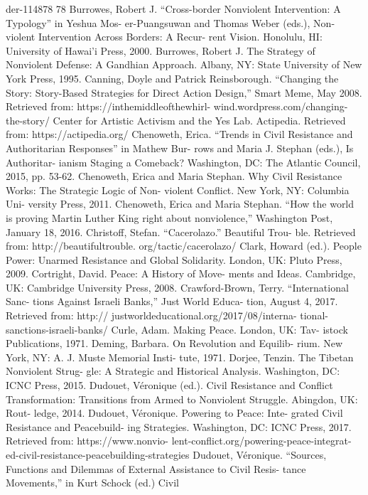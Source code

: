\documentclass[twoside,a4paper,12pt,fleqn,openany]{extbook}
\begin{document}
der-114878
78
Burrowes, Robert J. “Cross-border Nonviolent
Intervention: A Typology” in Yeshua Mos-
er-Puangsuwan and Thomas Weber (eds.), Non-
violent Intervention Across Borders: A Recur-
rent Vision. Honolulu, HI: University of Hawai’i
Press, 2000.
Burrowes, Robert J. The Strategy of Nonviolent
Defense: A Gandhian Approach. Albany, NY:
State University of New York Press, 1995.
Canning, Doyle and Patrick Reinsborough.
“Changing the Story: Story-Based Strategies for
Direct Action Design,” Smart Meme, May 2008.
Retrieved from: https://inthemiddleofthewhirl-
wind.wordpress.com/changing-the-story/
Center for Artistic Activism and the Yes Lab.
Actipedia. Retrieved from: https://actipedia.org/
Chenoweth, Erica. “Trends in Civil Resistance
and Authoritarian Responses” in Mathew Bur-
rows and Maria J. Stephan (eds.), Is Authoritar-
ianism Staging a Comeback? Washington, DC:
The Atlantic Council, 2015, pp. 53-62.
Chenoweth, Erica and Maria Stephan. Why Civil
Resistance Works: The Strategic Logic of Non-
violent Conflict. New York, NY: Columbia Uni-
versity Press, 2011.
Chenoweth, Erica and Maria Stephan. “How the
world is proving Martin Luther King right about
nonviolence,” Washington Post, January 18,
2016.
Christoff, Stefan. “Cacerolazo.” Beautiful Trou-
ble. Retrieved from: http://beautifultrouble.
org/tactic/cacerolazo/
Clark, Howard (ed.). People Power: Unarmed
Resistance and Global Solidarity. London, UK:
Pluto Press, 2009.
Cortright, David. Peace: A History of Move-
ments and Ideas. Cambridge, UK: Cambridge
University Press, 2008.
Crawford-Brown, Terry. “International Sanc-
tions Against Israeli Banks,” Just World Educa-
tion, August 4, 2017. Retrieved from: http://
justworldeducational.org/2017/08/interna-
tional-sanctions-israeli-banks/
Curle, Adam. Making Peace. London, UK: Tav-
istock Publications, 1971.
Deming, Barbara. On Revolution and Equilib-
rium. New York, NY: A. J. Muste Memorial Insti-
tute, 1971.
Dorjee, Tenzin. The Tibetan Nonviolent Strug-
gle: A Strategic and Historical Analysis.
Washington, DC: ICNC Press, 2015.
Dudouet, Véronique (ed.). Civil Resistance and
Conflict Transformation: Transitions from Armed
to Nonviolent Struggle. Abingdon, UK: Rout-
ledge, 2014.
Dudouet, Véronique. Powering to Peace: Inte-
grated Civil Resistance and Peacebuild-
ing Strategies. Washington, DC: ICNC Press,
2017. Retrieved from: https://www.nonvio-
lent-conflict.org/powering-peace-integrat-
ed-civil-resistance-peacebuilding-strategies
Dudouet, Véronique. “Sources, Functions and
Dilemmas of External Assistance to Civil Resis-
tance Movements,” in Kurt Schock (ed.) Civil
\end{document}
